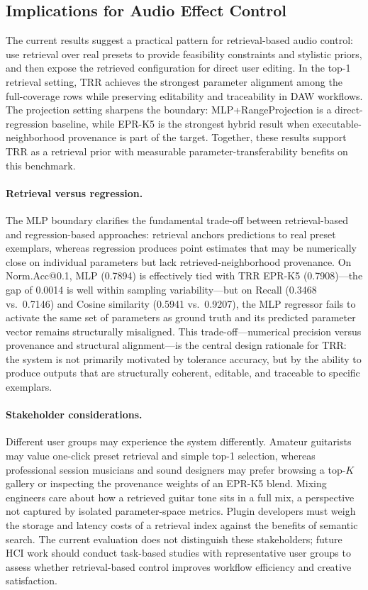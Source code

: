 \subsection{Implications for Audio Effect Control}

The current results suggest a practical pattern for retrieval-based audio control: use retrieval over real presets to provide feasibility constraints and stylistic priors, and then expose the retrieved configuration for direct user editing. In the top-1 retrieval setting, TRR achieves the strongest parameter alignment among the full-coverage rows while preserving editability and traceability in DAW workflows. The projection setting sharpens the boundary: MLP+RangeProjection is a direct-regression baseline, while EPR-K5 is the strongest hybrid result when executable-neighborhood provenance is part of the target. Together, these results support TRR as a retrieval prior with measurable parameter-transferability benefits on this benchmark.

\paragraph{Retrieval versus regression.} The MLP boundary clarifies the fundamental trade-off between retrieval-based and regression-based approaches: retrieval anchors predictions to real preset exemplars, whereas regression produces point estimates that may be numerically close on individual parameters but lack retrieved-neighborhood provenance. On Norm.Acc@0.1, MLP (0.7894) is effectively tied with TRR EPR-K5 (0.7908)---the gap of 0.0014 is well within sampling variability---but on Recall (0.3468 vs.\ 0.7146) and Cosine similarity (0.5941 vs.\ 0.9207), the MLP regressor fails to activate the same set of parameters as ground truth and its predicted parameter vector remains structurally misaligned. This trade-off---numerical precision versus provenance and structural alignment---is the central design rationale for TRR: the system is not primarily motivated by tolerance accuracy, but by the ability to produce outputs that are structurally coherent, editable, and traceable to specific exemplars.

\paragraph{Stakeholder considerations.} Different user groups may experience the system differently. Amateur guitarists may value one-click preset retrieval and simple top-1 selection, whereas professional session musicians and sound designers may prefer browsing a top-$K$ gallery or inspecting the provenance weights of an EPR-K5 blend. Mixing engineers care about how a retrieved guitar tone sits in a full mix, a perspective not captured by isolated parameter-space metrics. Plugin developers must weigh the storage and latency costs of a retrieval index against the benefits of semantic search. The current evaluation does not distinguish these stakeholders; future HCI work should conduct task-based studies with representative user groups to assess whether retrieval-based control improves workflow efficiency and creative satisfaction.


